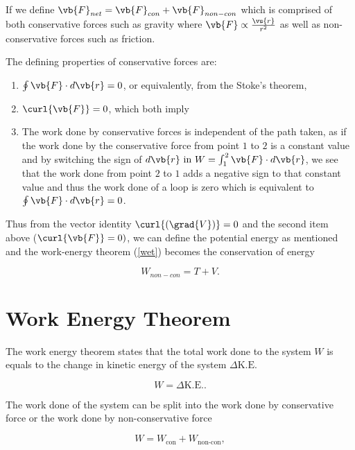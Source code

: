\documentclass[a4paper,12pt]{report}
\begin{document}
If we define \(\vb{F} _{net} = \vb{F} _{con} + \vb{F} _{non-con} \) which is comprised of both conservative forces such as gravity where \(\vb{F} \propto \frac{\vu{r} }{r^2} \) as well as non-conservative forces such as friction.

The defining properties of conservative forces are:

\begin{enumerate}
	\item \(\oint \vb{F} \cdot d\vb{r} = 0\), or equivalently, from the Stoke's theorem,

	\item \(\curl{\vb{F} } = 0\), which both imply

	\item The work done by conservative forces is independent of the path taken, as if the work done by the conservative force from point \(1\) to \(2\) is a constant value and by switching the sign of \(d\vb{r} \text{ in } W = \int_{1}^{2} \vb{F} \cdot d\vb{r}  \), we see that the work done from point \(2\) to \(1\) adds a negative sign to that constant value and thus the work done of a loop is zero which is equivalent to \(\oint \vb{F} \cdot d\vb{r} =0\).
\end{enumerate}

Thus from the vector identity \(\curl{(\grad{V}) } = 0\) and the second item above (\(\curl{\vb{F} } =0)\), we can define the potential energy as mentioned and the work-energy theorem (\cref{wet}) becomes the conservation of energy

\begin{equation}
	W_{non-con} = T + V. \label{con} 
\end{equation}

\section{Work Energy Theorem}

The work energy theorem states that the total work done to the system \(W\) is equals to the change in kinetic energy of the system \(\Delta \text{K.E.}\) 

\begin{equation}
	W = \Delta \text{K.E.} .
\end{equation}

The work done of the system can be split into the work done by conservative force or the work done by non-conservative force

\begin{equation}
	W = W_{\text{con} } + W_{\text{non-con} },  
\end{equation}
\end{document}
